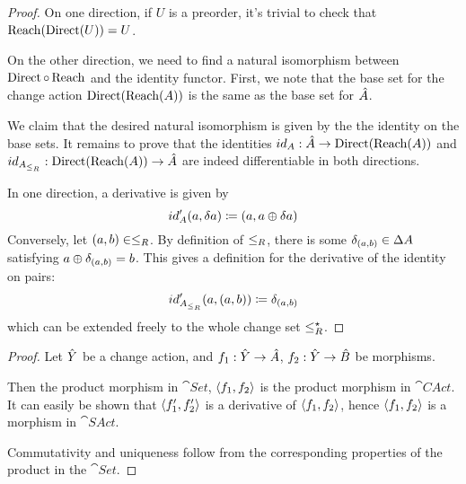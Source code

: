 \preordEquivalence*
\begin{proof}
  \label{prf:preordEquivalence}
  On one direction, if $U$ is a preorder, it's trivial to check that $\operatorname{Reach} (\operatorname{Direct} (U)) = U$.

  On the other direction, we need to find a natural isomorphism between $\operatorname{Direct} \circ \operatorname{Reach}$
  and the identity functor. First, we note that the base set for the change action
  $\operatorname{Direct}(\operatorname{Reach}(A))$ is the same as the base set for $\hat{A}$.

  We claim that the desired natural isomorphism is given by the
  the identity on the base sets. It remains to prove that the identities
  $id_A : \hat{A} \rightarrow \operatorname{Direct}(\operatorname{Reach}(A))$ and
  $id_{A_{\leq_R}} : \operatorname{Direct}(\operatorname{Reach}(A)) \rightarrow \hat{A}$
  are indeed differentiable in both directions.

  In one direction, a derivative is given by
  \begin{displaymath}
    id'_A(a, \delta a) \coloneqq (a, a \oplus \delta a)
  \end{displaymath}
  Conversely, let $(a, b) \in \leq_R$. By definition of $\leq_R$, there is some
  $\delta_{(a, b)} \in \Delta A$ satisfying $a \oplus \delta_{(a,b)} = b$.
  This gives a definition for the derivative of the identity on pairs:
  \begin{displaymath}
    id'_{A_{\leq_R}}(a, (a, b)) \coloneqq \delta_{(a, b)}
  \end{displaymath}
  which can be extended freely to the whole change set $\leq_R^\star$. 
\end{proof}

\products*
\begin{proof}
  \label{prf:products}
  Let $\hat{Y}$ be a change action, and $f_1: \hat{Y} \rightarrow \hat{A}$, $f_2: \hat{Y}
  \rightarrow \hat{B}$ be morphisms.

  Then the product morphism in $\cat{Set}$, $\left\langle {f_1}, {f_2} \right\rangle$ is the product
  morphism in $\cat{CAct}$. It can easily be
  shown that $\left\langle {f_1'}, {f_2'} \right\rangle$ is a derivative of $\left\langle {f_1}, {f_2} \right\rangle$,
  hence $\left\langle {f_1}, {f_2} \right\rangle$ is a morphism in $\cat{SAct}$.

  Commutativity and uniqueness follow from the corresponding properties of the
  product in the $\cat{Set}$.
\end{proof}

